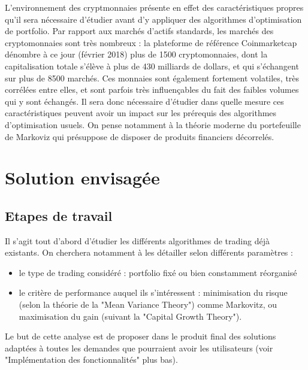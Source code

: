 \documentclass[a4paper]{article}
\begin{document}
L'environnement des cryptmonnaies présente en effet des caractéristiques propres qu'il sera nécessaire d'étudier avant d'y appliquer des algorithmes d'optimisation de portfolio. Par rapport aux marchés d'actifs standards, les marchés des cryptomonnaies sont très nombreux : la plateforme de référence Coinmarketcap dénombre à ce jour (février 2018) plus de 1500 cryptomonnaies, dont la capitalisation totale s'élève à plus de 430 milliards de dollars, et qui s'échangent sur plus de 8500 marchés. Ces monnaies sont également fortement volatiles, très corrélées entre elles, et sont parfois très influençables du fait des faibles volumes qui y sont échangés. Il sera donc nécessaire d'étudier dans quelle mesure ces caractéristiques peuvent avoir un impact sur les prérequis des algorithmes d'optimisation usuels. On pense notamment à la théorie moderne du portefeuille de Markoviz qui présuppose de disposer de produits financiers décorrelés.

\section{Solution envisagée}

\subsection{Etapes de travail}

Il s'agit tout d'abord d'étudier les différents algorithmes de trading déjà existants. On cherchera notamment à les détailler selon différents paramètres :
\begin{itemize}
    \item le type de trading considéré : portfolio fixé ou bien constamment réorganisé
    \item le critère de performance auquel ils s'intéressent : minimisation du risque (selon la théorie de la "Mean Variance Theory") comme Markovitz, ou maximisation du gain (suivant la "Capital Growth Theory").
\end{itemize}
Le but de cette analyse est de proposer dans le produit final des solutions adaptées à toutes les demandes que pourraient avoir les utilisateurs (voir "Implémentation des fonctionnalités" plus bas).
\end{document}
